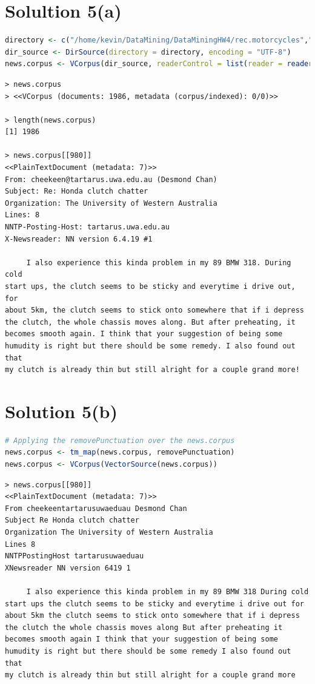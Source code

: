 \documentclass[a4paper,20pt]{article}
\begin{document}
\section*{Solultion 5(a)}
\begin{lstlisting}[language = R]
directory <- c("/home/kevin/DataMining/DataMiningHW4/rec.motorcycles","/home/kevin/DataMining/DataMiningHW4/rec.autos")
dir_source <- DirSource(directory = directory, encoding = "UTF-8")
news.corpus <- VCorpus(dir_source, readerControl = list(reader = reader(dir_source)))
\end{lstlisting}
\begin{verbatim}
> news.corpus
> <<VCorpus (documents: 1986, metadata (corpus/indexed): 0/0)>>

> length(news.corpus)
[1] 1986

> news.corpus[[980]]
<<PlainTextDocument (metadata: 7)>>
From: cheekeen@tartarus.uwa.edu.au (Desmond Chan)
Subject: Re: Honda clutch chatter
Organization: The University of Western Australia
Lines: 8
NNTP-Posting-Host: tartarus.uwa.edu.au
X-Newsreader: NN version 6.4.19 #1

     I also experience this kinda problem in my 89 BMW 318. During cold
start ups, the clutch seems to be sticky and everytime i drive out, for
about 5km, the clutch seems to stick onto somewhere that if i depress
the clutch, the whole chassis moves along. But after preheating, it
becomes smooth again. I think that your suggestion of being some
humudity is right but there should be some remedy. I also found out that
my clutch is already thin but still alright for a couple grand more!
\end{verbatim}
\newpage
\section*{Solution 5(b)}
\begin{lstlisting}[language = R]
# Applying the removePunctuation over the news.corpus
news.corpus <- tm_map(news.corpus, removePunctuation)
news.corpus <- VCorpus(VectorSource(news.corpus))
\end{lstlisting}
\begin{verbatim}
> news.corpus[[980]]
<<PlainTextDocument (metadata: 7)>>
From cheekeentartarusuwaeduau Desmond Chan
Subject Re Honda clutch chatter
Organization The University of Western Australia
Lines 8
NNTPPostingHost tartarusuwaeduau
XNewsreader NN version 6419 1

     I also experience this kinda problem in my 89 BMW 318 During cold
start ups the clutch seems to be sticky and everytime i drive out for
about 5km the clutch seems to stick onto somewhere that if i depress
the clutch the whole chassis moves along But after preheating it
becomes smooth again I think that your suggestion of being some
humudity is right but there should be some remedy I also found out that
my clutch is already thin but still alright for a couple grand more
\end{verbatim}
\end{document}
